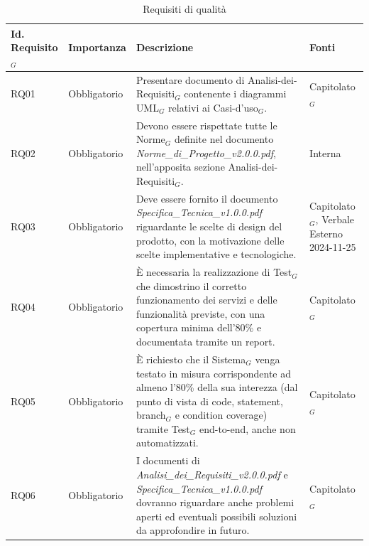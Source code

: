 \documentclass[10pt]{article}
\begin{document}
\begin{justify}
\begin{table}[H]
\centering
\renewcommand{\arraystretch}{1.5}
\begin{tabular}{|>{\centering\arraybackslash}m{2.7cm}|>{\centering\arraybackslash}m{2.7cm}|>{\centering\arraybackslash}m{6cm}|>{\centering\arraybackslash}m{2.1cm}|}
\hline
\textbf{Id. Requisito$_G$} & \textbf{Importanza} & \textbf{Descrizione} & \textbf{Fonti}\\
\hline
RQ01 & Obbligatorio & Presentare documento di Analisi-dei-Requisiti$_G$ contenente i diagrammi UML$_G$ relativi ai Casi-d'uso$_G$. & Capitolato$_G$\\
\hline
RQ02 & Obbligatorio & Devono essere rispettate tutte le Norme$_G$ definite nel documento \textit{Norme\_di\_Progetto\_v2.0.0.pdf}, nell'apposita sezione Analisi-dei-Requisiti$_G$. & Interna\\
\hline
RQ03 & Obbligatorio & Deve essere fornito il documento \textit{Specifica\_Tecnica\_v1.0.0.pdf} riguardante le scelte di design del prodotto, con la motivazione delle scelte implementative e tecnologiche. & Capitolato$_G$, Verbale Esterno 2024-11-25\\
\hline
RQ04 & Obbligatorio & È necessaria la realizzazione di Test$_G$ che dimostrino il corretto funzionamento dei servizi e delle funzionalità previste, con una copertura minima dell'80\% e documentata tramite un report.  & Capitolato$_G$\\
\hline
RQ05 & Obbligatorio & È richiesto che il Sistema$_G$ venga testato in misura corrispondente ad almeno l'80\% della sua interezza (dal punto di vista di code, statement, branch$_G$ e condition coverage) tramite Test$_G$ end-to-end, anche non automatizzati.  & Capitolato$_G$\\
\hline
RQ06 & Obbligatorio & I documenti di \textit{Analisi\_dei\_Requisiti\_v2.0.0.pdf} e \textit{Specifica\_Tecnica\_v1.0.0.pdf} dovranno riguardare anche problemi aperti ed eventuali possibili soluzioni da approfondire in futuro.  & Capitolato$_G$\\
\hline
\end{tabular}
\caption{Requisiti di qualità}
\end{table}


\end{justify}
\end{document}
